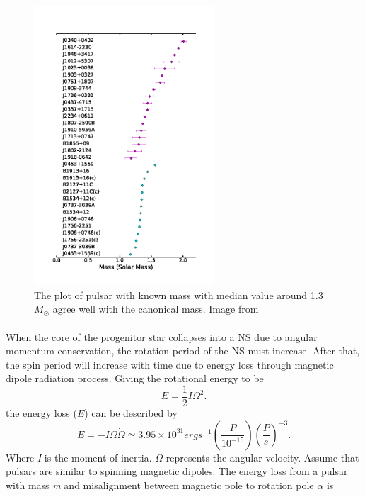 \documentclass[thesis_msc.tex]{subfiles}
\begin{document}
        \begin{figure}[h!] \centering
\includegraphics[width=0.6\textwidth]{figures/mass.png}
\caption{The plot of pulsar with known mass with median value around 1.3 $M_\odot$ agree well with the canonical mass. Image from \cite{antoniadis2016millisecond}}
\label{mass}
\end{figure}

    \paragraph{} When the core of the progenitor star collapses into a NS due to angular momentum conservation, the rotation period of the NS must increase. After that, the spin period will increase with time due to energy loss through magnetic dipole radiation process. Giving the rotational energy to be 
    \begin{equation}
    E=\frac{1}{2} I \Omega^2.
    \end{equation}
    the energy loss ($\dot{E}$) can be described by 
    \begin{equation}
    \dot{E}=-I\Omega\dot{\Omega}\simeq 3.95\times10^{31}erg s^{-1} (\frac{\dot{P}}{10^{-15}})(\frac{P}{s})^{-3}.
    \end{equation}
    Where \textit{I} is the moment of inertia. $\Omega$ represents the angular velocity. Assume that pulsars are similar to spinning magnetic dipoles. The energy loss from  a pulsar with mass \textit{m} and misalignment between magnetic pole to rotation pole $\alpha$ is 
   
\end{document}
